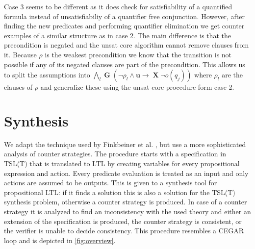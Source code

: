 \documentclass[runningheads]{llncs}
\newcommand{\globally}{\operatorname{\mathbf{G}}}
\newcommand{\lnext}{\operatorname{\mathbf{X}}}
\newcommand{\updf}{\mathbf{u}}
\begin{document}
Case 3 seems to be different as it does check for satisfiability of a quantified formula instead of unsatisfiabiliy of a quantifier free conjunction.
However, after finding the new predicates and performing quantifier elimination we get counter examples of a similar structure as in case 2.
The main difference is that the precondition is negated and the unsat core algorithm cannot remove clauses from it.
Because $\rho$ is the weakest precondition we know that the transition is not possible if any of its negated clauses are part of the precondition.
This allows us to split the assumptions into $\bigwedge_l \globally(\neg \rho_l \land \updf \rightarrow \lnext \neg o(q_j))$ where $\rho_l$ are the clauses of $\rho$ and generalize these using the unsat core procedure form case 2.







\section{Synthesis}
\label{sec:synthesis}

We adapt the technique used by Finkbeiner et al. \cite{finkbeiner2019a}, but use a more sophisticated analysis of counter strategies.
The procedure starts with a specification in TSL(T) that is translated to LTL by creating variables for every propositional expression and action.
Every predicate evaluation is treated as an input and only actions are assumed to be outputs.
This is given to a synthesis tool for propositional LTL: if it finds a solution this is also a solution for the TSL(T) synthesis problem,
otherwise a counter strategy is produced.
In case of a counter strategy it is analyzed to find an inconsistency with the used theory and either an extension of the specification is produced, the counter strategy is consistent, or the verifier is unable to decide consistency.
This procedure resembles a CEGAR \cite{clarke2000} loop and is depicted in \cref{fig:overview}.
\end{document}
